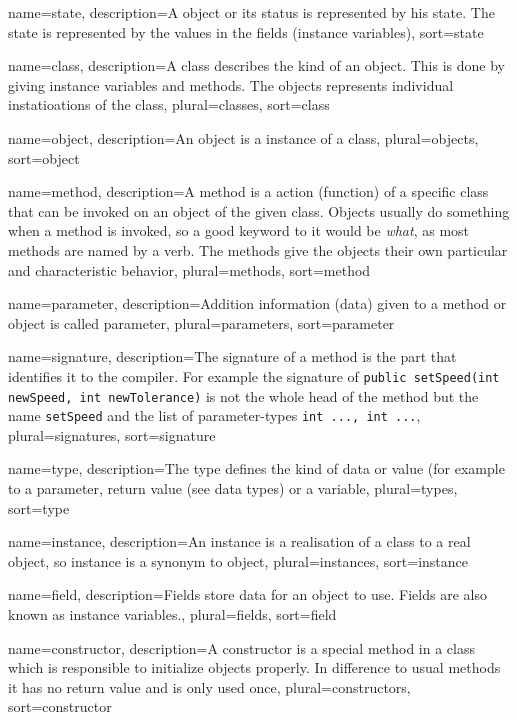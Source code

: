 {
	name=state,
	description={A object or its status is represented by his state.
		The state is represented by the values in the fields
		(instance variables)},
	sort=state
}


{
	name=class,
	description={A class describes the kind of an object. This is done
		by giving instance variables and methods. The objects 
		represents individual instatioations of the class},
	plural=classes,
	sort=class
}

{
	name=object,
	description={An object is a instance of a class},
	plural=objects,
	sort=object
}

{
	name=method,
	description={A method is a action (function) of a specific class that
		can be invoked on an object of the given class. Objects usually
		do something when a method is invoked, so a good keyword to it
		would be \textit{what}, as most methods are named by a verb.
		The methods give the objects their own particular and
		characteristic behavior},
	plural=methods,
	sort=method
}

{
	name=parameter,
	description={Addition information (data) given to a method or object
		is called parameter},
	plural=parameters,
	sort=parameter
}

{
	name=signature,
	description={The signature of a method is the part that identifies 
		it to the compiler. For example the signature of 
		\lstinline{public setSpeed(int newSpeed, int newTolerance)}
		is not the whole head of the method but the name 
		\lstinline{setSpeed} and the list of parameter-types 
		\lstinline{int ..., int ...}},
	plural=signatures,
	sort=signature
}

{
	name=type,
	description={The type defines the kind of data or value (for example 
		to a parameter, return value (see data types) or a variable},
	plural=types,
	sort=type
}

{
	name=instance,
	description={An instance is a realisation of a class to a real object,
		so instance is a synonym to object},
	plural=instances,
	sort=instance
}

{
	name=field,
	description={Fields store data for an object to use. Fields are also
		known as instance variables.},
	plural=fields,
	sort=field
}

{
	name=constructor,
	description={A constructor is a special method in a class which is
		responsible to initialize objects properly. In difference to
		usual methods it has no return value and is only used once},
	plural=constructors,
	sort=constructor
}

